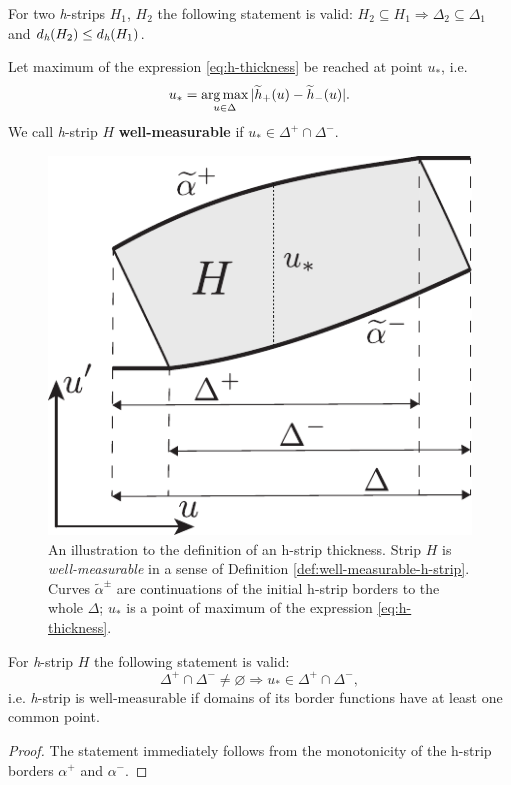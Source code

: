 \begin{remark}
\label{remark:h-strips-thickness}
	For two \emph{h}-strips $H_1$, $H_2$ the following statement is valid: $H_2 \subseteq H_1 \Rightarrow \Delta_2 \subseteq \Delta_1$ and $d_\emph{h}(H_2) \le d_\emph{h}(H_1)$.
\end{remark}

\begin{definition}
	Let maximum of the expression \eqref{eq:h-thickness} be reached at point $u_*$, i.e.
	\begin{equation}
		u_* = \operatorname*{arg\,max} \limits_{u \in \Delta} |\widetilde{h}_+(u) - \widetilde{h}_-(u)|.
	\label{eq:argmax}
	\end{equation}
	We call \emph{h}-strip $H$ {\bf well-measurable} if $u_* \in \Delta^+ \cap \Delta^-$.
\label{def:well-measurable-h-strip}
\end{definition}

\begin{figure}[h]
\centering
	\includegraphics[scale = 1]{pic/thickness definition}
	\caption{An illustration to the definition of an h-strip thickness. Strip $H$ is {\it well-measurable} in a sense of Definition \ref{def:well-measurable-h-strip}. Curves $\widetilde{\alpha}^{\pm}$ are continuations of the initial h-strip borders to the whole $\Delta$; $u_*$ is a point of maximum of the expression \eqref{eq:h-thickness}.}
\label{fig:thickness-definition}
\end{figure}

\begin{proposition}
\label{prop:h-strip-domains}
	For \emph{h}-strip $H$ the following statement is valid:
	\begin{equation}
		\Delta^+ \cap \Delta^- \neq \varnothing \Rightarrow u_* \in \Delta^+ \cap \Delta^-,
	\end{equation}
	i.e. \emph{h}-strip is well-measurable if domains of its border functions have at least one common point.
\end{proposition}
\begin{proof}
	The statement immediately follows from the monotonicity of the h-strip borders $\alpha^+$ and $\alpha^-$.
\end{proof}

